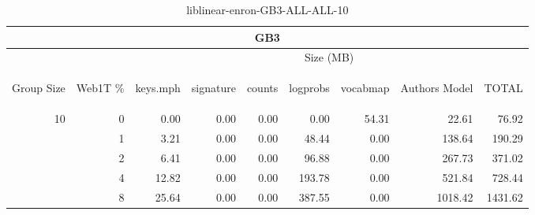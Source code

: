 \begin{center}
\begin{table}[htbp]
\begin{tabular}{ | r | r | r | r | r | r | r | r | r |}
\hline
\multicolumn{9}{|c|}{GB3}\\
\hline
 & & \multicolumn{7}{|c|}{Size (MB)}\\ \cline{3-9}
\begin{sideways}Group Size\end{sideways} & \begin{sideways}Web1T \% \end{sideways} & \begin{sideways}keys.mph\end{sideways} & \begin{sideways}signature\end{sideways} & \begin{sideways}counts\end{sideways} & \begin{sideways}logprobs\end{sideways} & \begin{sideways}vocabmap\end{sideways} & \begin{sideways}Authors Model \end{sideways} & \begin{sideways}TOTAL\end{sideways}\\
\hline
\multirow{4}{*}{10}
 & 0 & 0.00 & 0.00 & 0.00 & 0.00 & 54.31 & 22.61 & 76.92\\ \cline{2-9}
 & 1 & 3.21 & 0.00 & 0.00 & 48.44 & 0.00 & 138.64 & 190.29\\ \cline{2-9}
 & 2 & 6.41 & 0.00 & 0.00 & 96.88 & 0.00 & 267.73 & 371.02\\ \cline{2-9}
 & 4 & 12.82 & 0.00 & 0.00 & 193.78 & 0.00 & 521.84 & 728.44\\ \cline{2-9}
 & 8 & 25.64 & 0.00 & 0.00 & 387.55 & 0.00 & 1018.42 & 1431.62\\ \cline{2-9}
\hline
\end{tabular}
\caption{liblinear-enron-GB3-ALL-ALL-10}
\label{table:liblinear-enron-GB3-ALL-ALL-10}
\end{table}
\end{center}

